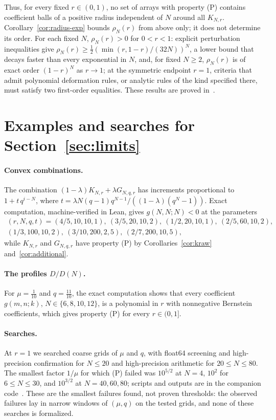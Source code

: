 Thus, for every fixed $r\in(0,1)$, no set of arrays with property (P) contains coefficient balls of a positive radius independent of $N$ around all $K_{N,r}$. Corollary~\ref{cor:radius-exp} bounds $\rho_N(r)$ from above only; it does not determine its order. For each fixed $N$, $\rho_N(r)>0$ for $0<r<1$: explicit perturbation inequalities give $\rho_N(r)\geq\frac12(\min(r,1-r)/(32N))^N$, a lower bound that decays faster than every exponential in $N$, and, for fixed $N\geq2$, $\rho_N(r)$ is of exact order $(1-r)^N$ as $r\to1$; at the symmetric endpoint $r=1$, criteria that admit polynomial deformation rules, or analytic rules of the kind specified there, must satisfy two first-order equalities. These results are proved in~\cite{P3}.

\section{Examples and searches for Section~\ref{sec:limits}}\label{app:search}

\paragraph{Convex combinations.} The combination $(1-\lambda)K_{N,r}+\lambda G_{N,q,r}$ has increments proportional to $1+t\,q^{i-N}$, where $t=\lambda N(q-1)q^{N-1}/((1-\lambda)(q^N-1))$. Exact computation, machine-verified in Lean, gives $g(N,N;N)<0$ at the parameters
\[\begin{gathered}(r,N,q,t)=(4/5,10,10,1),\ (3/5,20,10,2),\ (1/2,20,10,1),\ (2/5,60,10,2),\\ (1/3,100,10,2),\ (3/10,200,2,5),\ (2/7,200,10,5),\end{gathered}\]
while $K_{N,r}$ and $G_{N,q,r}$ have property (P) by Corollaries~\ref{cor:kraw} and~\ref{cor:additional}.

\paragraph{The profiles $D/D(N)$.} For $\mu=\frac1{10}$ and $q=\frac{11}{10}$, the exact computation shows that every coefficient $g(m,n;k)$, $N\in\{6,8,10,12\}$, is a polynomial in $r$ with nonnegative Bernstein coefficients, which gives property (P) for every $r\in(0,1]$.

\paragraph{Searches.} At $r=1$ we searched coarse grids of $\mu$ and $q$, with float64 screening and high-precision confirmation for $N\leq20$ and high-precision arithmetic for $20\leq N\leq80$. The smallest factor $1/\mu$ for which (P) failed was $10^{5/2}$ at $N=4$, $10^2$ for $6\leq N\leq30$, and $10^{3/2}$ at $N=40,60,80$; scripts and outputs are in the companion code~\cite{code}. These are the smallest failures found, not proven thresholds: the observed failures lay in narrow windows of $(\mu,q)$ on the tested grids, and none of these searches is formalized.

